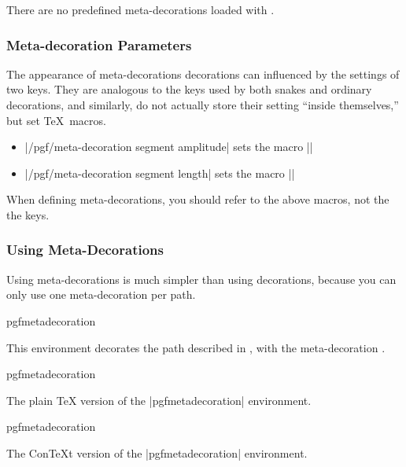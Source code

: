 There are no predefined meta-decorations loaded with \pgfname{}.

\subsubsection{Meta-decoration Parameters}

The appearance of meta-decorations decorations can influenced by the 
settings of two keys. They are analogous to the keys used 
by both snakes and ordinary decorations, and similarly, do not 
actually store their setting ``inside themselves,'' but set 
\TeX\ macros.

\begin{itemize}
	\item |/pgf/meta-decoration segment amplitude| 
		sets the macro |\pgfmetadecorationsegmentamplitude|
		
	\item |/pgf/meta-decoration segment length| 
		sets the macro |\pgfmetadecorationsegmentlength|
		
\end{itemize}

When defining meta-decorations, you should refer to the above macros, 
not the the keys.



\subsubsection{Using Meta-Decorations}

Using meta-decorations is much simpler than using decorations, because
you can only use one meta-decoration per path.

\begin{environment}{{pgfmetadecoration}}

	This environment decorates the path described in 
	, with the	meta-decoration .
	
\end{environment}

\begin{plainenvironment}{{pgfmetadecoration}}

	The plain \TeX{} version of the |{pgfmetadecoration}| environment.
	
\end{plainenvironment}

\begin{contextenvironment}{{pgfmetadecoration}}

	The Con\TeX t version of the |{pgfmetadecoration}| environment.
	
\end{contextenvironment}
